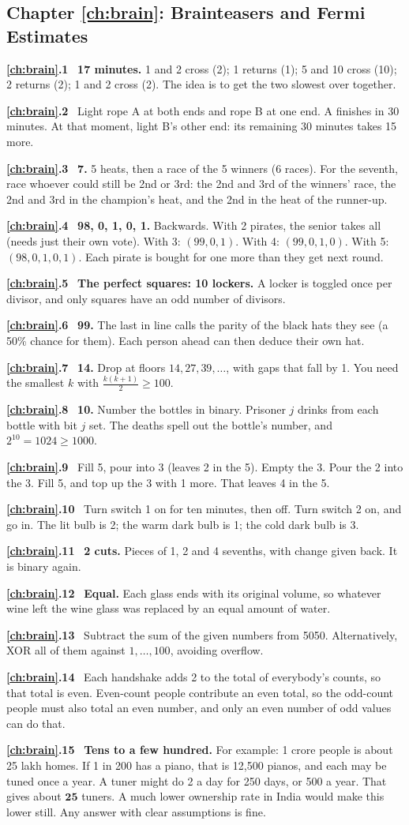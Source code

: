 \documentclass[11pt,a4paper,openany]{report}
\newcommand{\solchapter}[2]{\subsection*{Chapter \ref*{#1}: #2}\def\solprefix{\ref*{#1}}}
\newcommand{\sol}[1]{\par\smallskip\textbf{\solprefix.#1}\ }
\begin{document}
\solchapter{ch:brain}{Brainteasers and Fermi Estimates}
\sol{1} \textbf{17 minutes.} 1 and 2 cross (2); 1 returns (1); 5 and 10 cross (10); 2 returns (2); 1 and 2 cross (2). The idea is to get the two slowest over together.
\sol{2} Light rope A at both ends and rope B at one end. A finishes in 30 minutes. At that moment, light B's other end: its remaining 30 minutes takes 15 more.
\sol{3} \textbf{7.} 5 heats, then a race of the 5 winners (6 races). For the seventh, race whoever could still be 2nd or 3rd: the 2nd and 3rd of the winners' race, the 2nd and 3rd in the champion's heat, and the 2nd in the heat of the runner-up.
\sol{4} \textbf{98, 0, 1, 0, 1.} Backwards. With 2 pirates, the senior takes all (needs just their own vote). With 3: $(99,0,1)$. With 4: $(99,0,1,0)$. With 5: $(98,0,1,0,1)$. Each pirate is bought for one more than they get next round.
\sol{5} \textbf{The perfect squares: 10 lockers.} A locker is toggled once per divisor, and only squares have an odd number of divisors.
\sol{6} \textbf{99.} The last in line calls the parity of the black hats they see (a 50\% chance for them). Each person ahead can then deduce their own hat.
\sol{7} \textbf{14.} Drop at floors $14, 27, 39,\dots$, with gaps that fall by 1. You need the smallest $k$ with $\frac{k(k+1)}2\ge100$.
\sol{8} \textbf{10.} Number the bottles in binary. Prisoner $j$ drinks from each bottle with bit $j$ set. The deaths spell out the bottle's number, and $2^{10}=1024\ge1000$.
\sol{9} Fill 5, pour into 3 (leaves 2 in the 5). Empty the 3. Pour the 2 into the 3. Fill 5, and top up the 3 with 1 more. That leaves 4 in the 5.
\sol{10} Turn switch 1 on for ten minutes, then off. Turn switch 2 on, and go in. The lit bulb is 2; the warm dark bulb is 1; the cold dark bulb is 3.
\sol{11} \textbf{2 cuts.} Pieces of 1, 2 and 4 sevenths, with change given back. It is binary again.
\sol{12} \textbf{Equal.} Each glass ends with its original volume, so whatever wine left the wine glass was replaced by an equal amount of water.
\sol{13} Subtract the sum of the given numbers from 5050. Alternatively, XOR all of them against $1,\dots,100$, avoiding overflow.
\sol{14} Each handshake adds 2 to the total of everybody's counts, so that total is even. Even-count people contribute an even total, so the odd-count people must also total an even number, and only an even number of odd values can do that.
\sol{15} \textbf{Tens to a few hundred.} For example: 1 crore people is about 25 lakh homes. If 1 in 200 has a piano, that is 12,500 pianos, and each may be tuned once a year. A tuner might do 2 a day for 250 days, or 500 a year. That gives about $\mathbf{25}$ tuners. A much lower ownership rate in India would make this lower still. Any answer with clear assumptions is fine.
\end{document}
